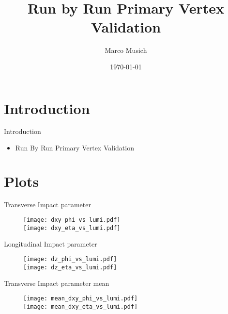 \documentclass{beamer}
\title[Primary Vertex Validation]{Run by Run Primary Vertex Validation}
\author{Marco Musich}
\institute{KIT - Karlsurher Institut f\"ur Technologie}
\date{\today}
\begin{document}
\begin{frame}
\titlepage
\end{frame}

\section{Introduction}
\begin{frame}{Introduction}
  {
    \begin{itemize}
    \item Run By Run Primary Vertex Validation
    \end{itemize}
  }
\end{frame}



\section{Plots}

\begin{frame}{Transverse Impact parameter}
\begin{figure}
   \centering
   \texttt{[image: dxy\_phi\_vs\_lumi.pdf]}\\
    \texttt{[image: dxy\_eta\_vs\_lumi.pdf]}
\end{figure}
\end{frame}

\begin{frame}{Longitudinal Impact parameter}
\begin{figure}
 \centering
 \texttt{[image: dz\_phi\_vs\_lumi.pdf]}\\
   \texttt{[image: dz\_eta\_vs\_lumi.pdf]}
 \end{figure}
\end{frame}

\begin{frame}{Transverse Impact parameter mean}
  \begin{figure}
    \centering
    \texttt{[image: mean\_dxy\_phi\_vs\_lumi.pdf]}\\
    \texttt{[image: mean\_dxy\_eta\_vs\_lumi.pdf]}
  \end{figure}
\end{frame}
\end{document}
